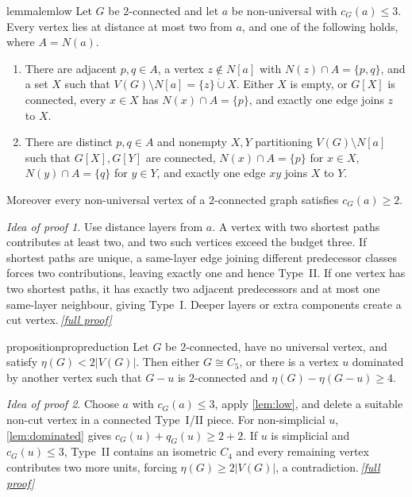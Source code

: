 \documentclass[11pt,a4paper]{article}
\theoremstyle{plain}
\theoremstyle{definition}
\theoremstyle{remark}
\newtheorem*{proofidea}{Idea of proof}
\newcommand{\fullproofref}[1]{\,\hyperref[#1]{\textit{[full proof]}}}
\begin{document}
\begin{restatable}{lemma}{lemlow}\label{lem:low}
Let $G$ be $2$-connected and let $a$ be non-universal with $c_G(a)\le3$.
Every vertex lies at distance at most two from $a$, and one of the
following holds, where $A=N(a)$.
\begin{enumerate}[label=\textup{\Roman*.}]
\item There are adjacent $p,q\in A$, a vertex $z\notin N[a]$ with
      $N(z)\cap A=\{p,q\}$, and a set $X$ such that
      $V(G)\setminus N[a]=\{z\}\mathbin{\dot\cup}X$. Either $X$ is empty,
      or $G[X]$ is connected, every $x\in X$ has $N(x)\cap A=\{p\}$,
      and exactly one edge joins $z$ to $X$.
\item There are distinct $p,q\in A$ and nonempty $X,Y$ partitioning
      $V(G)\setminus N[a]$ such that $G[X],G[Y]$ are connected,
      $N(x)\cap A=\{p\}$ for $x\in X$, $N(y)\cap A=\{q\}$ for $y\in Y$,
      and exactly one edge $xy$ joins $X$ to $Y$.
\end{enumerate}
Moreover every non-universal vertex of a $2$-connected graph satisfies
$c_G(a)\ge2$.
\end{restatable}
\begin{proofidea}
Use distance layers from $a$. A vertex with two shortest paths contributes
at least two, and two such vertices exceed the budget three. If shortest
paths are unique, a same-layer edge joining different predecessor classes
forces two contributions, leaving exactly one and hence Type~II. If one
vertex has two shortest paths, it has exactly two adjacent predecessors
and at most one same-layer neighbour, giving Type~I. Deeper layers or
extra components create a cut vertex.\fullproofref{pf:low}
\end{proofidea}

\begin{restatable}{proposition}{propreduction}\label{prop:reduction}
Let $G$ be $2$-connected, have no universal vertex, and satisfy
$\eta(G)<2|V(G)|$. Then either $G\cong C_5$, or there is a vertex $u$
dominated by another vertex such that $G-u$ is $2$-connected and
$\eta(G)-\eta(G-u)\ge4$.
\end{restatable}
\begin{proofidea}
Choose $a$ with $c_G(a)\le3$, apply \cref{lem:low}, and delete a suitable
non-cut vertex in a connected Type~I/II piece. For non-simplicial $u$,
\cref{lem:dominated} gives $c_G(u)+q_G(u)\ge2+2$. If $u$ is simplicial
and $c_G(u)\le3$, Type~II contains an isometric $C_4$ and every remaining
vertex contributes two more units, forcing $\eta(G)\ge2|V(G)|$, a
contradiction.\fullproofref{pf:reduction}
\end{proofidea}
\end{document}
